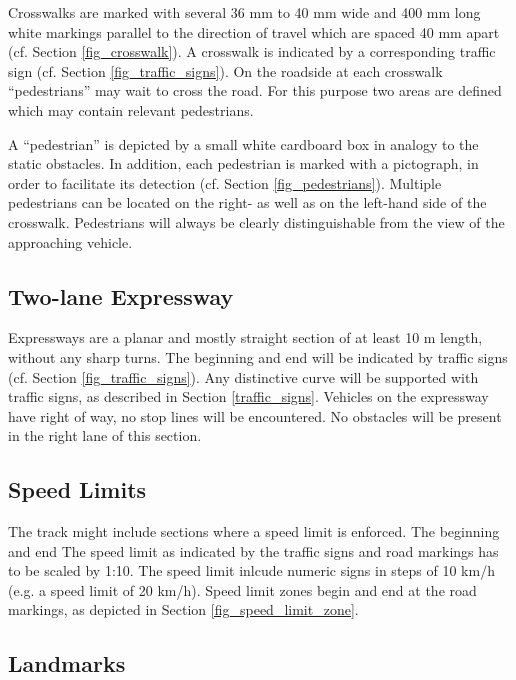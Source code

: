 Crosswalks are marked with several 36 mm to 40 mm wide and 400 mm long white markings parallel to the direction of travel which are spaced 40 mm apart (cf. Section \ref{fig_crosswalk}).
A crosswalk is indicated by a corresponding traffic sign (cf. Section \ref{fig_traffic_signs}).
On the roadside at each crosswalk “pedestrians” may wait to cross the road.
For this purpose two areas are defined which may contain relevant pedestrians.

A “pedestrian” is depicted by a small white cardboard box in analogy to the static obstacles.
In addition, each pedestrian is marked with a pictograph, in order to facilitate its detection (cf. Section \ref{fig_pedestrians}).
Multiple pedestrians can be located on the right- as well as on the left-hand side of the crosswalk.
Pedestrians will always be clearly distinguishable from the view of the approaching vehicle.

\subsection{Two-lane Expressway}
\label{two_lane_expressway}

Expressways are a planar and mostly straight section of at least 10 m length, without any sharp turns.
The beginning and end will be indicated by traffic signs (cf. Section \ref{fig_traffic_signs}).
Any distinctive curve will be supported with traffic signs, as described in Section \ref{traffic_signs}.
Vehicles on the expressway have right of way, no stop lines will be encountered.
No obstacles will be present in the right lane of this section.

\subsection{Speed Limits}
\label{speed_limits}

The track might include sections where a speed limit is enforced.
The beginning and end The speed limit as indicated by the traffic signs and road markings has to be scaled by 1:10.
The speed limit inlcude numeric signs in steps of 10 km/h (e.g. a speed limit of 20 km/h).
Speed limit zones begin and end at the road markings, as depicted in Section \ref{fig_speed_limit_zone}.

\subsection{Landmarks}
\label{landmarks}

